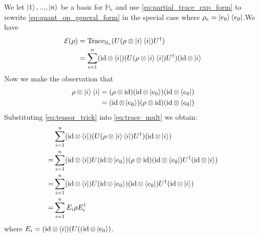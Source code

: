 \documentclass[12pt]{article}
\theoremstyle{plain}
\theoremstyle{definition}
\newcommand{\bb}[1]{\mathbb{#1}}
\newcommand{\call}[1]{\mathcal{#1}}
\begin{document}
	We let $\ket{1},...,\ket{n}$ be a basis for $\bb{H}_e$ and use \eqref{eq:partial_trace_exp_form} to rewrite \eqref{eq:quant_op_general_form} in the special case where $\rho_e = \ket{e_0}\bra{e_0}$.We have
	\begin{align}
		\call{E}(\rho) &= \operatorname{Trace}_{\bb{H}_e}(U (\rho \otimes \ket{i}\bra{i})U^\dagger)\\
		&= \sum_{i = 1}^n (\operatorname{id} \otimes \bra{i}) (U (\rho \otimes \ket{i}\bra{i})U^\dagger)(\operatorname{id} \otimes \ket{i}\label{eq:trace_mult}
	\end{align}
	Now we make the observation that
	\begin{align}
		\rho \otimes \ket{i}\bra{i} &= (\rho \otimes \operatorname{id})(\operatorname{id} \otimes \ket{e_0})(\operatorname{id} \otimes \bra{e_0})\\
		&= (\operatorname{id} \otimes \ket{e_0})(\rho \otimes \operatorname{id})(\operatorname{id} \otimes \bra{e_0})\label{eq:tensor_trick}
	\end{align}
	Substituting \eqref{eq:tensor_trick} into \eqref{eq:trace_mult} we obtain:
	\begin{align*}
		&\sum_{i = 1}^n (\operatorname{id} \otimes \bra{i}) (U (\rho \otimes \ket{i}\bra{i})U^\dagger)(\operatorname{id} \otimes \ket{i})\\
		= &\sum_{i = 1}^n (\operatorname{id} \otimes \bra{i}) U (\operatorname{id} \otimes \ket{e_0})(\rho \otimes \operatorname{id})(\operatorname{id} \otimes \bra{e_0})U^\dagger(\operatorname{id} \otimes \ket{i})\\
		= &\sum_{i = 1}^n (\operatorname{id} \otimes \bra{i}) U (\operatorname{id} \otimes \ket{e_0})(\operatorname{id} \otimes \bra{e_0})U^\dagger(\operatorname{id} \otimes \ket{i})\\
		= &\sum_{i = 1}^n E_i \rho E_i^\dagger
	\end{align*}
	where $E_i =(\operatorname{id} \otimes \bra{i}) (U ((\operatorname{id} \otimes \ket{e_0})$.
	
\end{document}
